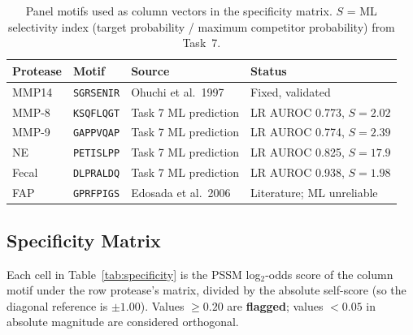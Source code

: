 \documentclass[10pt,a4paper]{article}
\begin{document}
\vspace{0.4em}
\begin{table}[H]
\centering
\begin{tabularx}{\textwidth}{@{}p{2.5cm} p{2.2cm} X p{3.2cm}@{}}
\toprule
\textbf{Protease} & \textbf{Motif} & \textbf{Source} & \textbf{Status} \\
\midrule
MMP14 & \texttt{SGRSENIR} & Ohuchi et al.\ 1997 & Fixed, validated \\
MMP-8 & \texttt{KSQFLQGT} & Task 7 ML prediction & LR AUROC 0.773, $S = 2.02$ \\
MMP-9 & \texttt{GAPPVQAP} & Task 7 ML prediction & LR AUROC 0.774, $S = 2.39$ \\
NE    & \texttt{PETISLPP} & Task 7 ML prediction & LR AUROC 0.825, $S = 17.9$ \\
Fecal & \texttt{DLPRALDQ} & Task 7 ML prediction & LR AUROC 0.938, $S = 1.98$ \\
FAP   & \texttt{GPRFPIGS} & Edosada et al.\ 2006 & Literature; ML unreliable \\
\bottomrule
\end{tabularx}
\caption{Panel motifs used as column vectors in the specificity matrix. $S$ = ML
selectivity index (target probability / maximum competitor probability) from Task~7.}
\label{tab:motifs}
\end{table}

\subsection{Specificity Matrix}

Each cell in Table~\ref{tab:specificity} is the PSSM log$_2$-odds score of the column
motif under the row protease's matrix, divided by the absolute self-score (so the
diagonal reference is $\pm 1.00$). Values $\geq 0.20$ are {\color{flagred}\textbf{flagged}};
values $< 0.05$ in absolute magnitude are considered orthogonal.
\end{document}
